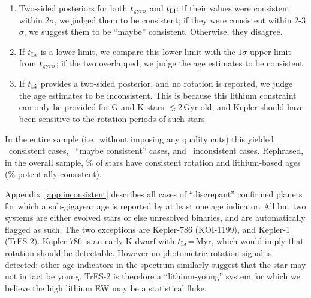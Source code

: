 \documentclass[11pt,twocolumn,tighten]{aastex63}
\begin{document}
\begin{enumerate}[leftmargin=*,topsep=0pt,itemsep=-1ex,partopsep=1ex,parsep=1ex]
  \item Two-sided posteriors for both $t_{\rm gyro}$ and $t_{\rm Li}$:
    if their values were consistent within 2$\sigma$, we judged them
    to be consistent; if they were consistent within 2-3$\sigma$, we
    suggest them to be ``maybe'' consistent.  Otherwise, they
    disagree.
  \item If $t_{\rm Li}$ is a lower limit, we compare this lower limit
    with the $1\sigma$ upper limit from $t_{\rm gyro}$; if the two
    overlapped, we judge the age estimates to be consistent.
  \item If $t_{\rm Li}$ provides a two-sided posterior, and no
    rotation is reported, we judge the age estimates to be
    inconsistent.  This is because this lithium constraint can only be
    provided for G and K stars $\lesssim$2\,Gyr old, and Kepler should
    have been sensitive to the rotation periods of such stars.
\end{enumerate}

In the entire sample (i.e.~without imposing any quality cuts) this
yielded \allagesyesconsistent\ consistent cases,
\allagesmaybeconsistent\ ``maybe consistent'' cases, and
\allagesnoconsistent\ inconsistent cases.  Rephrased, in the overall
sample, \fracconsistentallages\% of stars have consistent rotation and
lithium-based ages (\fracpotentiallyconsistentallages\% potentially
consistent).

Appendix~\ref{app:inconsistent} describes all cases of ``discrepant''
confirmed planets for which a sub-gigayear age is reported by at least
one age indicator.  All but two systems are
either evolved stars or else unresolved binaries, and are
automatically flagged as such.  The two exceptions are Kepler-786
(KOI-1199), and Kepler-1 (TrES-2).  Kepler-786 is an early K dwarf with
$t_{\rm Li}$=\kepseveneightsix\,Myr, which would imply that
rotation should be detectable.  However no photometric rotation signal is detected; other age
indicators in the spectrum similarly suggest that the star may not in
fact be young.  TrES-2 is therefore a ``lithium-young'' system for
which we believe the high lithium EW may be
a statistical fluke.

\end{document}
